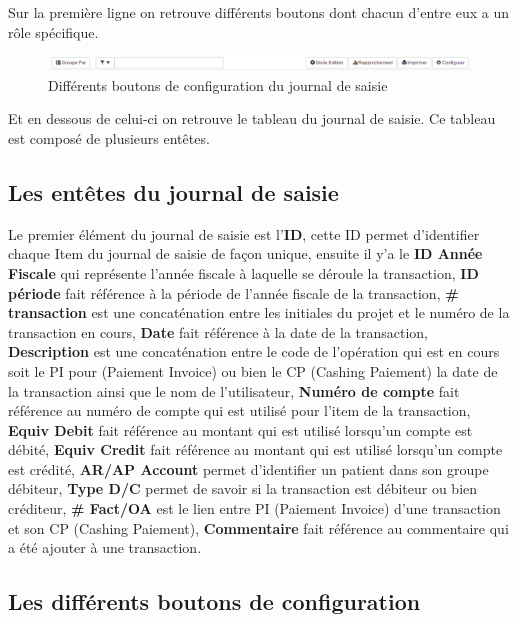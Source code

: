 \documentclass[12pt,a4paper]{report}
\begin{document}
Sur la première ligne on retrouve différents boutons dont chacun d'entre eux a un rôle spécifique.
\begin{figure}[h]
\begin{center}
\includegraphics[width=14cm]{pic/MenuConfigRepJourn.png}
\end{center}
\caption{Différents boutons de configuration du journal de saisie}
\label{Différents boutons de configuration du journal de saisie}
\end{figure}

Et en dessous de celui-ci on retrouve le tableau du journal de saisie. Ce tableau est composé de plusieurs entêtes. 
\subsection{Les entêtes du journal de saisie}
Le premier élément du journal de saisie est l'\textbf{ID}, cette ID permet d'identifier chaque Item du journal de saisie de façon unique, ensuite il y'a le \textbf{ID Année Fiscale} qui représente l'année fiscale à laquelle se déroule la transaction,  \textbf{ID période} fait référence à la période de l'année fiscale de la transaction, \textbf{\# transaction} est une concaténation entre les initiales du projet et le numéro de la transaction en cours, \textbf{Date} fait référence à la date de la transaction, \textbf{Description} est une concaténation entre le code de l'opération qui est en cours soit le PI pour (Paiement Invoice) ou bien le CP (Cashing Paiement) la date de la transaction ainsi que le nom de l'utilisateur, \textbf{Numéro de compte} fait référence au numéro de compte qui est utilisé pour l'item de la transaction, \textbf{Equiv Debit} fait référence au montant qui est utilisé lorsqu'un compte est débité,\textbf{ Equiv Credit} fait référence au montant qui est utilisé lorsqu'un compte est crédité, \textbf{AR/AP Account} permet d'identifier un patient dans son groupe débiteur, \textbf{Type D/C }permet de savoir si la transaction est débiteur ou bien créditeur, \textbf{\# Fact/OA }est le lien entre PI (Paiement Invoice) d'une transaction et son CP (Cashing Paiement), \textbf{Commentaire} fait référence au commentaire qui a été ajouter à une transaction.

\subsection{Les différents boutons de configuration}
\end{document}
